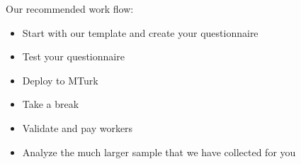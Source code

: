 \documentclass[aspectratio=169]{beamer}
\begin{document}
\begin{frame}

Our recommended work flow:
\begin{itemize}
\item Start with our template and create your questionnaire
\item Test your questionnaire
\item Deploy to MTurk
\item Take a break
\item Validate and pay workers
\item Analyze the much larger sample that we have collected for you
\end{itemize}

\end{frame}
\end{document}
